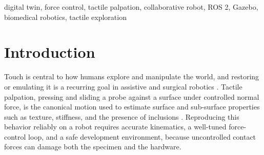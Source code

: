 \documentclass[conference]{IEEEtran}
\begin{document}
\begin{abstract}
This paper presents a digital-twin platform of a six degree-of-freedom
collaborative manipulator for closed-loop, force-controlled tactile palpation in
a biomedical context. A kinematically faithful simulation of a Dobot CR10 arm,
running under ROS 2 and Gazebo, is coupled to the physical robot through a
real-time mirroring link, so that the same control software drives both the
virtual and the real arm. A force-instrumented contact tool, mounted on a
uniaxial load cell, reproduces the robotic palpation protocol of Gupta et al.:
the end effector approaches a surface, regulates the normal contact force to a
selectable set point, holds until the force stabilizes, slides laterally at
constant speed, and retracts. Force regulation uses an outer proportional-integral
loop that converts the contact-force error into a Cartesian approach velocity,
mapped to joint motion through a damped least-squares Jacobian and streamed at
33 Hz. We describe the twin, its kinematics, the finite-state palpation protocol,
the force-control law expressed as a tunable admittance, the safety layer that
bounds contact forces, and the force-tracking metrics used to characterize the
closed-loop response. The platform provides a safe, repeatable environment for
developing tactile-exploration behaviors before deployment on the physical
system.
\end{abstract}

\begin{IEEEkeywords}
digital twin, force control, tactile palpation, collaborative robot, ROS 2,
Gazebo, biomedical robotics, tactile exploration
\end{IEEEkeywords}

\section{Introduction}
Touch is central to how humans explore and manipulate the world, and restoring
or emulating it is a recurring goal in assistive and surgical robotics
\cite{gupta2021,konstantinova2014}. Tactile palpation, pressing and sliding a
probe against a surface under controlled normal force, is the canonical motion
used to estimate surface and sub-surface properties such as texture, stiffness,
and the presence of inclusions \cite{konstantinova2014}. Reproducing this
behavior reliably on a robot requires accurate kinematics, a well-tuned
force-control loop, and a safe development environment, because uncontrolled
contact forces can damage both the specimen and the hardware.
\end{document}
